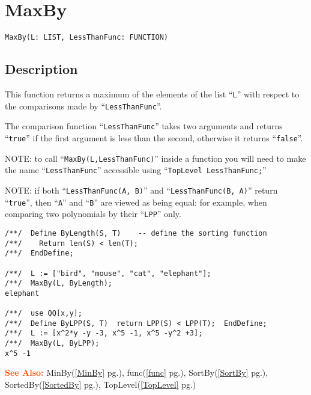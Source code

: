 \documentclass[a4paper]{mybook}
\newenvironment{command}{}{} %
\newcommand\SeeAlso{\par\textcolor{OrangeRed}{\textbf{\large See Also: }}}
\begin{document}
\section{MaxBy}
\label{MaxBy}
\begin{command} %


\begin{Verbatim}[label=syntax, rulecolor=\color{MidnightBlue},
frame=single]
MaxBy(L: LIST, LessThanFunc: FUNCTION)
\end{Verbatim}


\subsection*{Description}

This function returns a maximum of the elements of the list ``\verb&L&''
with respect to the comparisons made by ``\verb&LessThanFunc&''.
\par 
The comparison function ``\verb&LessThanFunc&'' takes two arguments and returns ``\verb&true&''
if the first argument is less than the second, otherwise it returns ``\verb&false&''.
\par 
NOTE: to call ``\verb&MaxBy(L,LessThanFunc)&'' inside a function you will need
to make the name ``\verb&LessThanFunc&'' accessible using ``\verb&TopLevel LessThanFunc;&''
\par 
NOTE: if both ``\verb&LessThanFunc(A, B)&'' and ``\verb&LessThanFunc(B, A)&'' return
``\verb&true&'', then ``\verb&A&'' and ``\verb&B&'' are viewed as being equal:
for example, when comparing two polynomials by their ``\verb&LPP&'' only.
\begin{Verbatim}[label=example, rulecolor=\color{PineGreen}, frame=single]
/**/  Define ByLength(S, T)    -- define the sorting function
/**/    Return len(S) < len(T);
/**/  EndDefine;

/**/  L := ["bird", "mouse", "cat", "elephant"];
/**/  MaxBy(L, ByLength);
elephant

/**/  use QQ[x,y];
/**/  Define ByLPP(S, T)  return LPP(S) < LPP(T);  EndDefine;
/**/  L := [x^2*y -y -3, x^5 -1, x^5 -y^2 +3];
/**/  MaxBy(L, ByLPP);
x^5 -1
\end{Verbatim}


\SeeAlso %
  MinBy(\ref{MinBy} pg.\pageref{MinBy}), 
    func(\ref{func} pg.\pageref{func}), 
    SortBy(\ref{SortBy} pg.\pageref{SortBy}), 
    SortedBy(\ref{SortedBy} pg.\pageref{SortedBy}), 
    TopLevel(\ref{TopLevel} pg.\pageref{TopLevel})
\end{command} %
\end{document}
